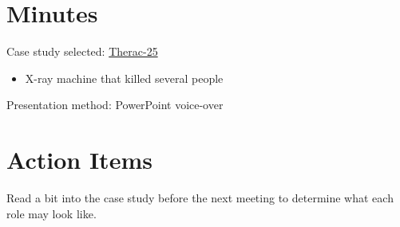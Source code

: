 \documentclass[11pt]{meetingmins}
\begin{document}
  \maketitle

  \section{Minutes}
  \begin{items}
    \item Case study selected: \href{https://ethicsunwrapped.utexas.edu/case-study/therac-25}{Therac-25}
    \begin{itemize}
      \item X-ray machine that killed several people
    \end{itemize}
    \item Presentation method: PowerPoint voice-over
  \end{items}

  \section{Action Items}
  \begin{items}
    \item Read a bit into the case study before the next meeting to determine what each role may look like.
  \end{items}

  \vspace{1em}

\end{document}
